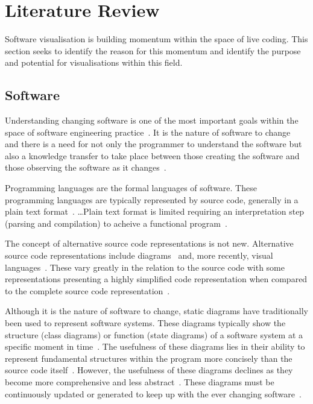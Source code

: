 
\chapter{Literature Review}

Software visualisation is building momentum within the space of live coding. This section seeks to identify the reason for this momentum and identify the purpose and potential for visualisations within this field.

\section{Software}

Understanding changing software is one of the most important goals within the space of software engineering practice~\cite{Tao2012}. It is the nature of software to change~\cite{Purushothaman2005} and there is a need for not only the programmer to understand the software but also a knowledge transfer to take place between those creating the software and those observing the software as it changes~.

Programming languages are the formal languages of software. These programming languages are typically represented by source code, generally in a plain text format~\cite{Badros2000}. \ldots Plain text format is limited requiring an interpretation step (parsing and compilation) to acheive a functional program~\cite{Badros2000}.

The concept of alternative source code representations is not new. Alternative source code representations include diagrams~ and, more recently, visual languages~. These vary greatly in the relation to the source code with some representations presenting a highly simplified code representation when compared to the complete source code representation~.

Although it is the nature of software to change, static diagrams have traditionally been used to represent software systems. These diagrams typically show the structure (class diagrams) or function (state diagrams) of a software system at a specific moment in time~. The usefulness of these diagrams lies in their ability to represent fundamental structures within the program more concisely than the source code itself~. However, the usefulness of these diagrams declines as they become more comprehensive and less abstract~. These diagrams must be continuously updated or generated to keep up with the ever changing software~.

